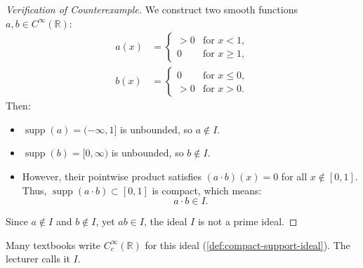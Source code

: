 \begin{content}
\begin{center}
\end{center}

\begin{proof}[Verification of Counterexample]
We construct two smooth functions $a, b \in C^\infty(\mathbb{R})$:
\begin{align*}
a(x) &= \begin{cases} > 0 & \text{for } x < 1, \\ 0 & \text{for } x \ge 1, \end{cases} \\
b(x) &= \begin{cases} 0 & \text{for } x \le 0, \\ > 0 & \text{for } x > 0. \end{cases}
\end{align*}
Then:
\begin{itemize}
    \item $\operatorname{supp}(a) = (-\infty, 1]$ is unbounded, so $a \notin I$.
    \item $\operatorname{supp}(b) = [0, \infty)$ is unbounded, so $b \notin I$.
    \item However, their pointwise product satisfies $(a \cdot b)(x) = 0$ for all $x \notin [0, 1]$. Thus, $\operatorname{supp}(a \cdot b) \subset [0, 1]$ is compact, which means:
    \[
    a \cdot b \in I.
    \]
\end{itemize}
Since $a \notin I$ and $b \notin I$, yet $a b \in I$, the ideal $I$ is not a prime ideal.
\end{proof}
\end{content}

\begin{aiNote}
Many textbooks write $C_c^\infty(\mathbb{R})$ for this ideal (\cref{def:compact-support-ideal}). The lecturer calls it $I$.
\end{aiNote}

